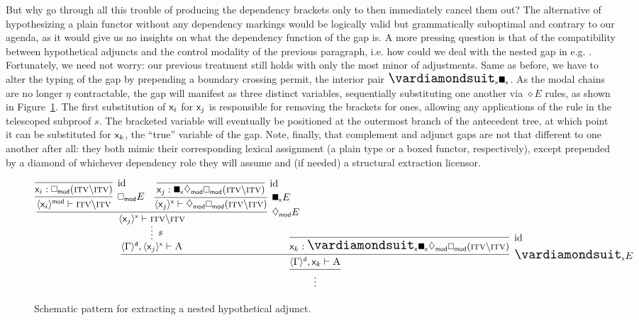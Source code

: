 But why go through all this trouble of producing the dependency brackets only to then immediately cancel them out?
The alternative of hypothesizing a plain functor without any dependency markings would be logically valid but grammatically suboptimal and contrary to our agenda, as it would give us no insights on what the dependency function of the gap is.
A more pressing question is that of the compatibility between hypothetical adjuncts and the control modality of the previous paragraph, i.e. how could we deal with the nested gap in e.g. .
Fortunately, we need not worry: our previous treatment still holds with only the most minor of adjustments.
Same as before, we have to alter the typing of the gap by prepending a boundary crossing permit, the interior pair $\dxdia{x}\dxbox{x}$.
As the modal chains are no longer $\eta$ contractable, the gap will manifest as three distinct variables, sequentially substituting one another via $\diamond E$ rules, as shown in Figure~\ref{figure:higher_order_nested_dep}.
The first substitution of $\mathsf{x}_{\mathnormal{i}}$ for $\mathsf{x}_{\mathnormal{j}}$ is responsible for removing the  brackets for  ones, allowing any applications of the \Extraction{} rule in the telescoped subproof $s$.
The bracketed variable will eventually be positioned at the outermost branch of the antecedent tree, at which point it can be substituted for $\mathsf{x}_{\mathnormal{k}}$, the ``true'' variable of the gap.
Note, finally, that complement and adjunct gaps are not that different to one another after all: they both mimic their corresponding lexical assignment (a plain type or a boxed functor, respectively), except prepended by a diamond of whichever dependency role they will assume and (if needed) a structural extraction licensor.


\begin{figure}
	\smaller
	\[
		\infer{\vdots}{
			\infer[\dxdia{x} E]{\dbra{\Gamma}{d}, \vark \vdash \prop{A}}{
				\infer*[s]{\dbra{\Gamma}{d}, \dbra{\varj}{x} \vdash \prop{A}}{
					\infer[\ddia{mod} E]{\dbra{\varj}{x} \vdash \gtype{itv}\divleft\gtype{itv}}{
						\infer[\dbox{mod} E]{\dbra{\vari}{mod} \vdash \gtype{itv}\divleft\gtype{itv}}{
							\infer[\Ax]{\vari : \dbox{mod}(\gtype{itv}\divleft\gtype{itv})}{}
						}
						&
						\infer[\dxbox{x} E]{\dbra{\varj}{x} \vdash \ddia{mod}\dbox{mod}(\gtype{itv}\divleft\gtype{itv})}{
							\infer[\Ax]{\varj : \dxbox{x}\ddia{mod}\dbox{mod}(\gtype{itv}\divleft\gtype{itv})}{}
						}
					}
				}
				&
				\hspace{-20pt}
				\infer[\Ax]{\vark : \dxdia{x}\dxbox{x}\ddia{mod}\dbox{mod}(\gtype{itv}\divleft\gtype{itv})}{}
			}
		}
	\]
	\caption{Schematic pattern for extracting a nested hypothetical adjunct.}
	\label{figure:higher_order_nested_dep}
\end{figure}

